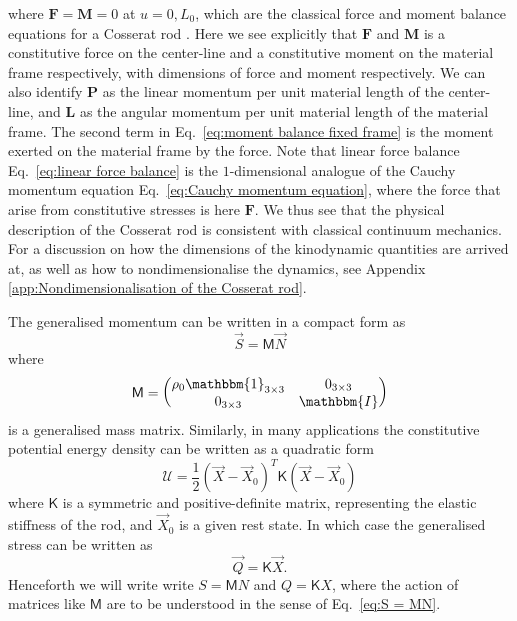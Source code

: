 where $\mathbf{F} = \mathbf{M} = 0$ at $u = 0, L_0$, which are the classical force and moment balance equations for a Cosserat rod \citep{cosseratTheoryDeformableBodies1909, simoGeometricallyexactRodModel1991}. Here we see explicitly that $\mathbf{F}$ and $\mathbf{M}$ is a constitutive force on the center-line and a constitutive moment on the material frame respectively, with dimensions of force and moment respectively. We can also identify $\mathbf{P}$ as the linear momentum per unit material length of the center-line, and $\mathbf{L}$ as the angular momentum per unit material length of the material frame. The second term in Eq.~\ref{eq:moment balance fixed frame} is the moment exerted on the material frame by the force. Note that linear force balance Eq.~\ref{eq:linear force balance} is  the $1$-dimensional analogue of the Cauchy momentum equation Eq.~\ref{eq:Cauchy momentum equation}, where the force that arise from constitutive stresses is here $\mathbf{F}$. We thus see that the physical description of the Cosserat rod is consistent with classical continuum mechanics. For a discussion on how the dimensions of the kinodynamic quantities are arrived at, as well as how to nondimensionalise the dynamics, see Appendix \ref{app:Nondimensionalisation of the Cosserat rod}.

The generalised momentum can be written in a compact form as
\begin{equation} \label{eq:S = MN}
\vec{S} = \mathsf{M} \vec{N} 
\end{equation}
where
\begin{equation} \label{eq:Cosserat rod mass matrix}
\mathsf{M} = \begin{pmatrix}
\rho_0 \mathbbm{1}_{3 \times 3} & 0_{3 \times 3} \\
0_{3 \times 3} & \mathbbm{I}
\end{pmatrix}
\end{equation}
is a generalised mass matrix. Similarly, in many applications the constitutive potential energy density can be written as a quadratic form
\begin{equation} \label{eq:U quadratic form}
\mathcal{U} = \frac{1}{2} (\vec{X} - \vec{X}_0)^T \mathsf{K} (\vec{X} - \vec{X}_0)
\end{equation}
where $\mathsf{K}$ is a symmetric and positive-definite matrix, representing the elastic stiffness of the rod, and $\vec{X}_0$ is a given rest state. In which case the generalised stress can be written as
\begin{equation}
\vec{Q} = \mathsf{K} \vec{X}.
\end{equation}
Henceforth we will write write $S = \mathsf{M} N$ and $Q = \mathsf{K} X$, where the action of matrices like $\mathsf{M}$ are to be understood in the sense of Eq.~\ref{eq:S = MN}.

